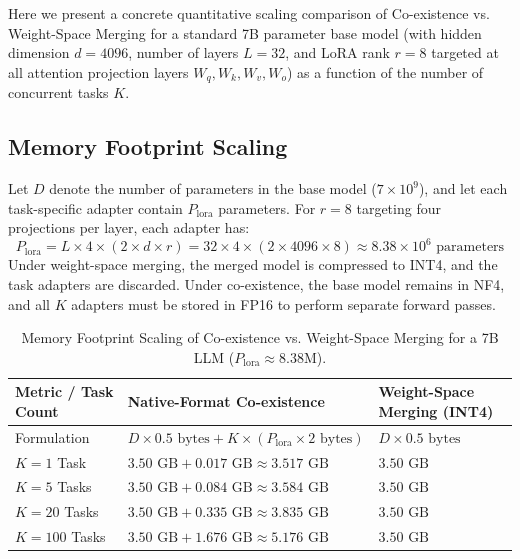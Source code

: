 \documentclass{article}
\theoremstyle{plain}
\theoremstyle{definition}
\theoremstyle{remark}
\begin{document}
Here we present a concrete quantitative scaling comparison of Co-existence vs. Weight-Space Merging for a standard 7B parameter base model (with hidden dimension $d = 4096$, number of layers $L = 32$, and LoRA rank $r = 8$ targeted at all attention projection layers $W_q, W_k, W_v, W_o$) as a function of the number of concurrent tasks $K$.

\subsection{Memory Footprint Scaling}
Let $D$ denote the number of parameters in the base model ($7 \times 10^9$), and let each task-specific adapter contain $P_{\text{lora}}$ parameters. For $r=8$ targeting four projections per layer, each adapter has:
\begin{equation}
  P_{\text{lora}} = L \times 4 \times (2 \times d \times r) = 32 \times 4 \times (2 \times 4096 \times 8) \approx 8.38 \times 10^6 \text{ parameters}
\end{equation}
Under weight-space merging, the merged model is compressed to INT4, and the task adapters are discarded. Under co-existence, the base model remains in NF4, and all $K$ adapters must be stored in FP16 to perform separate forward passes.

\begin{table}[H]
\centering
\caption{Memory Footprint Scaling of Co-existence vs. Weight-Space Merging for a 7B LLM ($P_{\text{lora}} \approx 8.38\text{M}$).}
\label{tab:memory_scaling}
\vskip 0.1in
\begin{tabular}{lll}
\toprule
Metric / Task Count & Native-Format Co-existence & Weight-Space Merging (INT4) \\
\midrule
Formulation & $D \times 0.5 \text{ bytes} + K \times (P_{\text{lora}} \times 2 \text{ bytes})$ & $D \times 0.5 \text{ bytes}$ \\
$K = 1$ Task & $3.50 \text{ GB} + 0.017 \text{ GB} \approx 3.517 \text{ GB}$ & $3.50 \text{ GB}$ \\
$K = 5$ Tasks & $3.50 \text{ GB} + 0.084 \text{ GB} \approx 3.584 \text{ GB}$ & $3.50 \text{ GB}$ \\
$K = 20$ Tasks & $3.50 \text{ GB} + 0.335 \text{ GB} \approx 3.835 \text{ GB}$ & $3.50 \text{ GB}$ \\
$K = 100$ Tasks & $3.50 \text{ GB} + 1.676 \text{ GB} \approx 5.176 \text{ GB}$ & $3.50 \text{ GB}$ \\
\bottomrule
\end{tabular}
\end{table}
\end{document}
